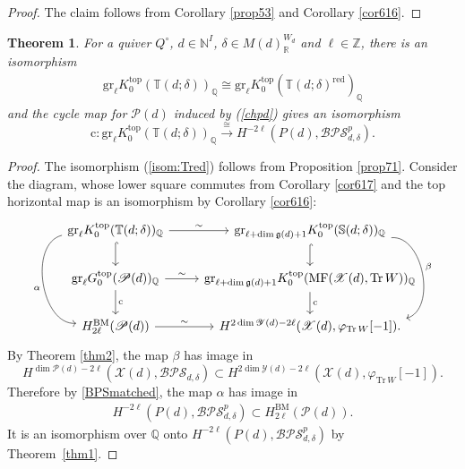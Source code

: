 \documentclass [11pt,oneside,a4paper,mathscr]{amsart}
\newtheorem{thm}{Theorem}[section]
\theoremstyle{definition}
\newcommand{\X}{\mathscr{X}}
\newcommand{\Tr}{\mathop{\rm Tr}}
\begin{document}
\begin{proof}
    The claim follows from Corollary \ref{prop53} and Corollary \ref{cor616}.
\end{proof}


\begin{thm}\label{thm1plus}
For a quiver $Q^{\circ}$, $d\in \mathbb{N}^I$, $\delta \in M(d)_{\mathbb{R}}^{W_d}$ and $\ell \in \mathbb{Z}$,  
there is an isomorphism 
\begin{align}\label{isom:Tred}
    \mathrm{gr}_\ell K^{\mathrm{top}}_0(\mathbb{T}(d; \delta))_{\mathbb{Q}}\cong \mathrm{gr}_\ell K^{\mathrm{top}}_0(\mathbb{T}(d; \delta)^{\mathrm{red}})_{\mathbb{Q}}
\end{align}
and 
the cycle map for $\mathscr{P}(d)$ induced by (\ref{chpd})
gives 
an isomorphism 
\begin{equation}\label{cyclemappreproj}
    \mathrm{c}\colon \mathrm{gr}_\ell K^{\mathrm{top}}_0(\mathbb{T}(d; \delta))_{\mathbb{Q}}\stackrel{\cong}{\to}
    H^{-2\ell}(P(d), \mathcal{BPS}^p_{d, \delta}).
     \end{equation}
\end{thm}


\begin{proof}%
The isomorphism (\ref{isom:Tred}) follows from Proposition \ref{prop71}.
Consider the diagram, whose lower square commutes from Corollary \ref{cor617} and the top horizontal map is an isomorphism by Corollary \ref{cor616}:
\begin{equation*}
    \begin{tikzcd}
    \mathrm{gr}_\ell K^{\mathrm{top}}_0(\mathbb{T}(d; \delta))_{\mathbb{Q}}\arrow[d, hook]\arrow[r, "\sim"]\arrow[dd, bend right=85, "\alpha"']& \mathrm{gr}_{\ell+\dim \mathfrak{g}(d)+1} K^{\mathrm{top}}_0(\mathbb{S}(d; \delta))_{\mathbb{Q}}\arrow[d, hook]\arrow[dd, bend left=85, "\beta"]\\
        \mathrm{gr}_\ell G^{\mathrm{top}}_0(\mathscr{P}(d))_{\mathbb{Q}}\arrow[d, "\mathrm{c}"]\arrow[r, "\sim"]& \mathrm{gr}_{\ell+\dim \mathfrak{g}(d)+1} K^{\mathrm{top}}_0(\mathrm{MF}(\X(d), \mathrm{Tr}\,W))_{\mathbb{Q}}\arrow[d, "\mathrm{c}"]
        \\
        H^{\mathrm{BM}}_{2\ell}(\mathscr{P}(d))\arrow[r, "\sim"]& H^{2\dim \mathscr{Y}(d)-2\ell}(\X(d), \varphi_{\Tr W}[-1]).
    \end{tikzcd}
\end{equation*}
By Theorem \ref{thm2},
the map $\beta$ has image in \[H^{\dim \mathscr{P}(d)-2\ell}(\X(d), \mathcal{BPS}_{d,\delta})\subset H^{2\dim\mathscr{Y}(d)-2\ell}(\mathscr{X}(d), \varphi_{\mathrm{Tr}\,W}[-1]).\] 
Therefore by \eqref{BPSmatched}, the map $\alpha$ has image in 
\begin{align}\label{image:TP}
H^{-2\ell}(P(d), \mathcal{BPS}^p_{d, \delta})
\subset H_{2\ell}^{\mathrm{BM}}(\mathscr{P}(d)).
\end{align}
It is an isomorphism over $\mathbb{Q}$ onto $H^{-2\ell}(P(d), \mathcal{BPS}^p_{d, \delta})$ by Theorem~\ref{thm1}. 
\end{proof}
\end{document}
